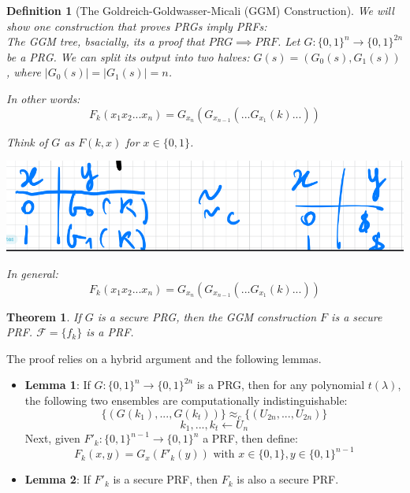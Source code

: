 \documentclass[11pt, a4paper]{article}
\newtheorem{thm}{Theorem}
\newtheorem{defn}{Definition}
\begin{document}
\begin{defn}[The Goldreich-Goldwasser-Micali (GGM) Construction]
We will show one construction that proves PRGs imply PRFs:\\
The GGM tree, bsacially, its a proof that $PRG \implies PRF$.
Let $G: \{0,1\}^n \to \{0,1\}^{2n}$ be a PRG. We can split its output into two halves: $G(s) = (G_0(s), G_1(s))$, where $|G_0(s)| = |G_1(s)| = n$.


In other words:
$$ F_k(x_1x_2...x_n) = G_{x_n}(G_{x_{n-1}}(...G_{x_1}(k)...)) $$

Think of $G$ as $F(k,x)$ for $x \in \{0,1\}$.
\begin{center}
\includegraphics[scale=0.4]{img/Comp_sec/PRF2.png}
\end{center}

\begin{center}
\end{center}
In general:\\
$$ F_k(x_1x_2...x_n) = G_{x_n}(G_{x_{n-1}}(...G_{x_1}(k)...)) $$
\end{defn}
\begin{thm}
    If $G$ is a secure PRG, then the GGM construction $F$ is a secure PRF. $\mathcal{F} = \{ f_k \}$ is a PRF.
\end{thm}
The proof relies on a hybrid argument and the following lemmas.

\begin{itemize}
    \item \textbf{Lemma 1}: If $G: \{0,1\}^n \to \{0,1\}^{2n}$ is a PRG, then for any polynomial $t(\lambda)$, the following two ensembles are computationally indistinguishable:
    $$ \{ (G(k_1), ..., G(k_t)) \} \approx_c \{ (U_{2n}, ..., U_{2n}) \}$$
    $$ k_1, ... , k_t \leftarrow U_n $$
    Next, given $F'_k \colon \{0,1\}^{n-1} \to \{0,1\}^n$ a PRF, then define:
    $$ F_k(x,y) = G_x(F'_{k}(y)) \text{ with } x \in \{0,1\}, y \in \{0,1\}^{n-1} $$
    \item \textbf{Lemma 2}: If $F'_k$ is a secure PRF, then $F_k$ is also a secure PRF.
\end{itemize}
\end{document}
